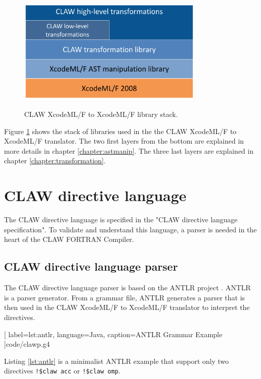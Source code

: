\documentclass[a4paper, 11pt]{report}
\def\clawfcomp{CLAW FORTRAN Compiler\xspace}
\def\xcodeml{XcodeML/F\xspace}
\begin{document}
\begin{figure}[!ht]
  \centering
  \includegraphics[width=0.8\textwidth]{resources/cx2x_stack.png} \\
  \caption{CLAW \xcodeml to \xcodeml library stack.}
  \label{fig:cx2x_stack}
\end{figure}

Figure \ref{fig:cx2x_stack} shows the stack of libraries used in the the CLAW
\xcodeml to \xcodeml translator. The two first layers from the bottom are
explained in more details in chapter \ref{chapter:astmanip}. The three last
layers are explained in chapter \ref{chapter:transformation}.


\chapter{CLAW directive language}
The CLAW directive language is specified in the "CLAW directive language
specification". To validate and understand this language, a parser is needed
in the heart of the \clawfcomp.

\section{CLAW directive language parser}
The CLAW directive language parser is based on the ANTLR project
\cite{Parr:2013:DAR:2501720}. ANTLR is a parser generator. From a grammar file,
ANTLR generates a parser that is then used in the CLAW \xcodeml to \xcodeml
translator to interpret the directives.


  [
    label=lst:antlr,
    language=Java,
    caption=ANTLR Grammar Example
  ]{code/clawp.g4}

Listing \ref{lst:antlr} is a minimalist ANTLR example that support only two
directives \lstinline|!$claw acc| or \lstinline|!$claw omp|.
\end{document}

